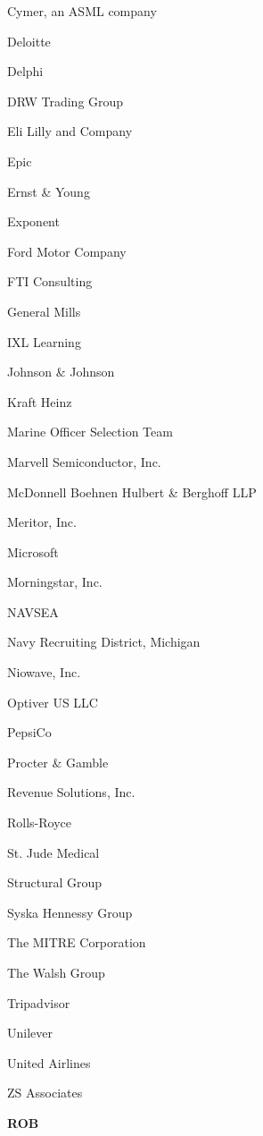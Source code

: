\documentclass[twoside]{article}
\begin{document}
\begin{center}
\begin{multicols}{5}
\begin{FlushLeft}
\begin{compactitem}
\item Cymer, an ASML company
\item Deloitte
\item Delphi
\item DRW Trading Group
\item Eli Lilly and Company
\item Epic
\item Ernst \& Young
\item Exponent
\item Ford Motor Company
\item FTI Consulting
\item General Mills
\item IXL Learning
\item Johnson \& Johnson
\item Kraft Heinz
\item Marine Officer Selection Team
\item Marvell Semiconductor, Inc.
\item McDonnell Boehnen Hulbert \& Berghoff LLP
\item Meritor, Inc.
\item Microsoft
\item Morningstar, Inc.
\item NAVSEA
\item Navy Recruiting District, Michigan
\item Niowave, Inc.
\item Optiver US LLC
\item PepsiCo
\item Procter \& Gamble
\item Revenue Solutions, Inc.
\item Rolls-Royce
\item St. Jude Medical
\item Structural Group
\item Syska Hennessy Group
\item The MITRE Corporation
\item The Walsh Group
\item Tripadvisor
\item Unilever
\item United Airlines
\item ZS Associates
\end{compactitem}
        \end{FlushLeft}
        \vspace{1em}
        {\fontsize{14}{16}\selectfont \bf ROB}\\
        \vspace{-1em}

\end{multicols}
\end{center}
\end{document}
